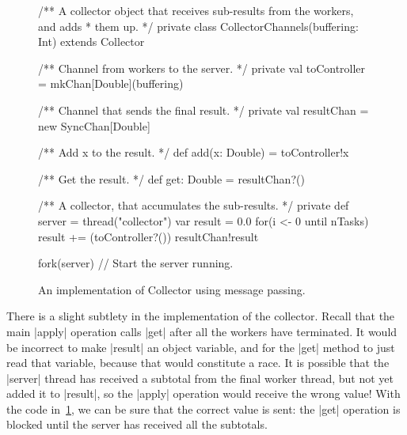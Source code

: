\begin{figure}
\begin{scala}
  /** A collector object that receives sub-results from the workers, and adds
    * them up. */
  private class CollectorChannels(buffering: Int) extends Collector{
    /** Channel from workers to the server. */
    private val toController = mkChan[Double](buffering)

    /** Channel that sends the final result. */
    private val resultChan = new SyncChan[Double]

    /** Add x to the result. */
    def add(x: Double) = toController!x

    /** Get the result. */
    def get: Double = resultChan?()
    
    /** A collector, that accumulates the sub-results. */
    private def server = thread("collector"){
      var result = 0.0
      for(i <- 0 until nTasks) result += (toController?())
      resultChan!result
    }

    fork(server)    // Start the server running.
  }
\end{scala}
\caption{An implementation of {\scalashape Collector} using message passing.}
\label{fig:collector}
\end{figure}



There is a slight subtlety in the implementation of the collector.  Recall
that the main |apply| operation calls |get| after all the workers have
terminated.  It would be incorrect to make |result| an object variable, and
for the |get| method to just read that variable, because that would constitute
a race.  It is possible that the |server| thread has received a subtotal
from the final worker thread, but not yet added it to |result|, so the |apply|
operation would receive the wrong value!  With the code
in~\ref{fig:collector}, we can be sure that the correct value is sent: the
|get| operation is blocked until the server has received all the subtotals.

